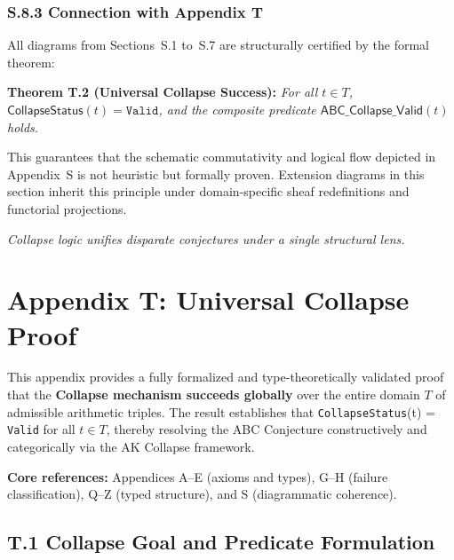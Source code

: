 \documentclass[11pt]{article}
\begin{document}
\subsubsection*{S.8.3 Connection with Appendix T}

All diagrams from Sections~S.1 to~S.7 are structurally certified by the formal theorem:

\begin{center}
\textbf{Theorem T.2 (Universal Collapse Success):}  
\emph{For all \( t \in T \), \( \mathsf{CollapseStatus}(t) = \texttt{Valid} \),  
and the composite predicate \( \mathsf{ABC\_Collapse\_Valid}(t) \) holds.}
\end{center}

This guarantees that the schematic commutativity and logical flow depicted in Appendix~S  
is not heuristic but formally proven. Extension diagrams in this section inherit this principle  
under domain-specific sheaf redefinitions and functorial projections.

\begin{center}
\textit{Collapse logic unifies disparate conjectures under a single structural lens.}
\end{center}



\section*{Appendix T: Universal Collapse Proof}

This appendix provides a fully formalized and type-theoretically validated proof that the \textbf{Collapse mechanism succeeds globally}  
over the entire domain \( T \) of admissible arithmetic triples. The result establishes that \texttt{CollapseStatus}(t) = \texttt{Valid} for all \( t \in T \),  
thereby resolving the ABC Conjecture constructively and categorically via the AK Collapse framework.

\vspace{1em}
\noindent
\textbf{Core references:} Appendices A–E (axioms and types), G–H (failure classification), Q–Z (typed structure), and S (diagrammatic coherence).

\subsection*{T.1 Collapse Goal and Predicate Formulation}
\end{document}
